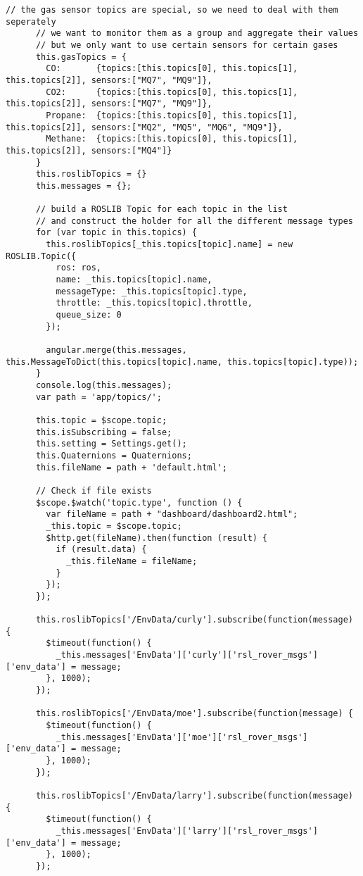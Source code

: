 \begin{lstlisting}[breaklines=true,basicstyle=\tiny]
      // the gas sensor topics are special, so we need to deal with them seperately
      // we want to monitor them as a group and aggregate their values
      // but we only want to use certain sensors for certain gases
      this.gasTopics = {
        CO:       {topics:[this.topics[0], this.topics[1], this.topics[2]], sensors:["MQ7", "MQ9"]},
        CO2:      {topics:[this.topics[0], this.topics[1], this.topics[2]], sensors:["MQ7", "MQ9"]},
        Propane:  {topics:[this.topics[0], this.topics[1], this.topics[2]], sensors:["MQ2", "MQ5", "MQ6", "MQ9"]},
        Methane:  {topics:[this.topics[0], this.topics[1], this.topics[2]], sensors:["MQ4"]}
      }
      this.roslibTopics = {}
      this.messages = {};

      // build a ROSLIB Topic for each topic in the list
      // and construct the holder for all the different message types
      for (var topic in this.topics) {
        this.roslibTopics[_this.topics[topic].name] = new ROSLIB.Topic({
          ros: ros,
          name: _this.topics[topic].name,
          messageType: _this.topics[topic].type,
          throttle: _this.topics[topic].throttle,
          queue_size: 0
        });

        angular.merge(this.messages, this.MessageToDict(this.topics[topic].name, this.topics[topic].type));
      }
      console.log(this.messages);
      var path = 'app/topics/';

      this.topic = $scope.topic;
      this.isSubscribing = false;
      this.setting = Settings.get();
      this.Quaternions = Quaternions;
      this.fileName = path + 'default.html';

      // Check if file exists
      $scope.$watch('topic.type', function () {
        var fileName = path + "dashboard/dashboard2.html";
        _this.topic = $scope.topic;
        $http.get(fileName).then(function (result) {
          if (result.data) {
            _this.fileName = fileName;
          }
        });
      });

      this.roslibTopics['/EnvData/curly'].subscribe(function(message) {
        $timeout(function() {
          _this.messages['EnvData']['curly']['rsl_rover_msgs']['env_data'] = message;
        }, 1000);
      });

      this.roslibTopics['/EnvData/moe'].subscribe(function(message) {
        $timeout(function() {
          _this.messages['EnvData']['moe']['rsl_rover_msgs']['env_data'] = message;
        }, 1000);
      });

      this.roslibTopics['/EnvData/larry'].subscribe(function(message) {
        $timeout(function() {
          _this.messages['EnvData']['larry']['rsl_rover_msgs']['env_data'] = message;
        }, 1000);
      });


\end{lstlisting}
